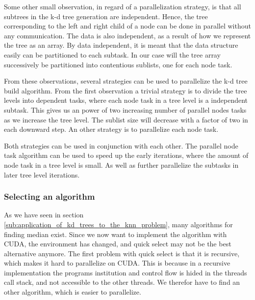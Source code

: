 Some other small observation, in regard of a parallelization strategy, is that all subtrees in the k-d tree generation are independent. Hence, the tree corresponding to the left and right child of a node can be done in parallel without any communication. The data is also independent, as a result of how we represent the tree as an array. By data independent, it is meant that the data structure easily can be partitioned to each subtask. In our case will the tree array successively be partitioned into contentious sublists, one for each node task.

From these observations, several strategies can be used to parallelize the k-d tree build algorithm. From the first observation a trivial strategy is to divide the tree levels into dependent tasks, where each node task in a tree level is a independent subtask. This gives us an power of two increasing number of parallel nodes tasks as we increase the tree level. The sublist size will decrease with a factor of two in each downward step. An other strategy is to parallelize each node task.

Both strategies can be used in conjunction with each other. The parallel node task algorithm can be used to speed up the early iterations, where the amount of node task in a tree level is small. As well as further parallelize the subtasks in later tree level iterations.



\subsubsection{Selecting an algorithm} %
\label{ssub:selecting_a_algorithm}



As we have seen in section \ref{sub:application_of_kd_trees_to_the_knn_problem}, many algorithms for finding median exist. Since we now want to implement the algorithm with CUDA, the environment has changed, and quick select may not be the best alternative anymore. The first problem with quick select is that it is recursive, which makes it hard to parallelize on CUDA. This is because in a recursive implementation the programs institution and control flow is hided in the threads call stack, and not accessible to the other threads. We therefor have to find an other algorithm, which is easier to parallelize.


